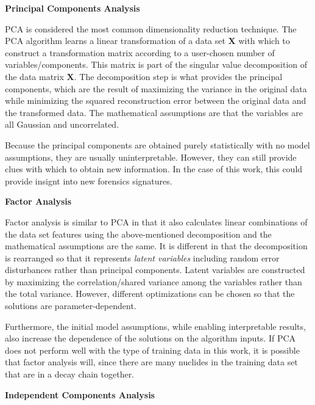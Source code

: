\vspace{5mm} \noindent \textbf{Principal Components Analysis} \vspace{5mm}

\Gls{PCA} is considered the most common dimensionality reduction technique.
The \gls{PCA} algorithm learns a linear transformation of a data set
$\boldsymbol{X}$ with which to construct a transformation matrix according to a
user-chosen number of variables/components.  This matrix is part of the
singular value decomposition of the data matrix $\boldsymbol{X}$.  The
decomposition step is what provides the principal components, which are the
result of maximizing the variance in the original data while minimizing the
squared reconstruction error between the original data and the transformed
data. The mathematical assumptions are that the variables are all Gaussian and
uncorrelated.

Because the principal components are obtained purely statistically with no
model assumptions, they are usually uninterpretable. However, they can still
provide clues with which to obtain new information. In the case of this work,
this could provide insignt into new forensics signatures.

\vspace{5mm} \noindent \textbf{Factor Analysis} \vspace{5mm}

Factor analysis is similar to \gls{PCA} in that it also calculates linear
combinations of the data set features using the above-mentioned decomposition
and the mathematical assumptions are the same.  It is different in that the
decomposition is rearranged so that it represents \textit{latent variables}
including random error disturbances rather than principal components.  Latent
variables are constructed by maximizing the correlation/shared variance among
the variables rather than the total variance.  However, different optimizations
can be chosen so that the solutions are parameter-dependent.  

Furthermore, the initial model assumptions, while enabling interpretable
results, also increase the dependence of the solutions on the algorithm inputs.
If \gls{PCA} does not perform well with the type of training data in this work,
it is possible that factor analysis will, since there are many nuclides in the
training data set that are in a decay chain together.

\vspace{5mm} \noindent \textbf{Independent Components Analysis} \vspace{5mm}

